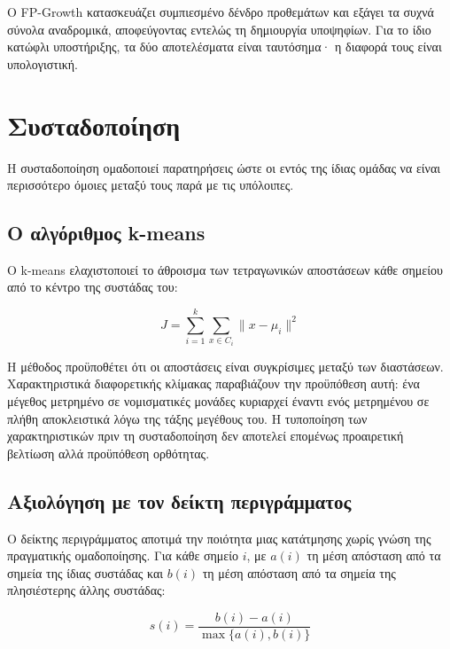 Ο \textenglish{FP-Growth} \cite{han2000mining} κατασκευάζει συμπιεσμένο
δένδρο προθεμάτων και εξάγει τα συχνά σύνολα αναδρομικά, αποφεύγοντας εντελώς
τη δημιουργία υποψηφίων. Για το ίδιο κατώφλι υποστήριξης, τα δύο αποτελέσματα
είναι ταυτόσημα· η διαφορά τους είναι υπολογιστική.

\section{Συσταδοποίηση}
\label{sec:clustering-theory}

Η συσταδοποίηση ομαδοποιεί παρατηρήσεις ώστε οι εντός της ίδιας ομάδας να
είναι περισσότερο όμοιες μεταξύ τους παρά με τις υπόλοιπες.

\subsection{Ο αλγόριθμος k-means}

Ο \textenglish{k-means} \cite{macqueen1967} ελαχιστοποιεί το άθροισμα των
τετραγωνικών αποστάσεων κάθε σημείου από το κέντρο της συστάδας του:

\begin{equation}
  J = \sum_{i=1}^{k} \sum_{x \in C_i} \lVert x - \mu_i \rVert^2
\end{equation}

Η μέθοδος προϋποθέτει ότι οι αποστάσεις είναι συγκρίσιμες μεταξύ των
διαστάσεων. Χαρακτηριστικά διαφορετικής κλίμακας παραβιάζουν την προϋπόθεση
αυτή: ένα μέγεθος μετρημένο σε νομισματικές μονάδες κυριαρχεί έναντι ενός
μετρημένου σε πλήθη αποκλειστικά λόγω της τάξης μεγέθους του. Η τυποποίηση των
χαρακτηριστικών πριν τη συσταδοποίηση δεν αποτελεί επομένως προαιρετική
βελτίωση αλλά προϋπόθεση ορθότητας.

\subsection{Αξιολόγηση με τον δείκτη περιγράμματος}

Ο δείκτης περιγράμματος \cite{rousseeuw1987silhouettes} αποτιμά την
ποιότητα μιας κατάτμησης χωρίς γνώση της πραγματικής ομαδοποίησης. Για κάθε
σημείο $i$, με $a(i)$ τη μέση απόσταση από τα σημεία της ίδιας συστάδας και
$b(i)$ τη μέση απόσταση από τα σημεία της πλησιέστερης άλλης συστάδας:

\begin{equation}
  s(i) = \frac{b(i) - a(i)}{\max\{a(i), b(i)\}}
\end{equation}

